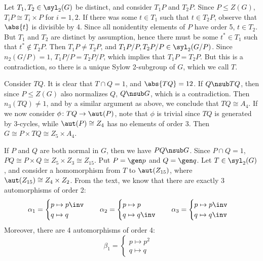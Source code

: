 \begin{solenum}
    Let $T_1, T_2 \in \syl_2(G)$ be distinct, and consider $T_1P$ and $T_2P$.
	Since $P \leq Z(G)$, $T_iP \cong T_i \times P$ for $i = 1, 2$.
	If there was some $t \in T_1$ such that $t \in T_2P$, observe that $\abs{t}$ is divisible by 4.
	Since all nonidentity elements of $P$ have order 5, $t \in T_2$.
	But $T_1$ and $T_2$ are distinct by assumption, hence there must be some $t^* \in T_1$ such that $t^* \notin T_2P$.
	Then $T_1P \neq T_2P$, and $T_1P/P, T_2P/P \in \syl_2(G/P)$.
	Since $n_2(G/P) = 1$, $T_1P/P = T_2P/P$, which implies that $T_1P = T_2P$.
	But this is a contradiction, so there is a unique Sylow 2-subgroup of $G$, which we call $T$.

    Consider $TQ$.
	It is clear that $T \cap Q = 1$, and $\abs{TQ} = 12$.
	If $Q \nsub TQ$, then since $P \leq Z(G)$ also normalizes $Q$, $Q \nsub G$, which is a contradiction.
	Then $n_3(TQ) \neq 1$, and by a similar argument as above, we conclude that $TQ \cong A_4$.
	If we now consider $\phi \colon TQ \to \aut(P)$, note that $\phi$ is trivial since $TQ$ is generated by 3-cycles, while $\aut(P) \cong Z_4$ has no elements of order 3.
	Then $G \cong P \times TQ \cong Z_5 \times A_4$.
    \item If $P$ and $Q$ are both normal in $G$, then we have $PQ \nsub G$.
	Since $P \cap Q = 1$, $PQ \cong P \times Q \cong Z_5 \times Z_3 \cong Z_{15}$.
	Put $P = \gen p$ and $Q = \gen q$.
	Let $T \in \syl_2(G)$, and consider a homomorphism from $T$ to $\aut(Z_{15})$, where $\aut(Z_{15}) \cong Z_4 \times Z_2$.
	From the text, we know that there are exactly 3 automorphisms of order 2:
    \[
    	\alpha_1 = 
        \begin{cases}
            p \mapsto p\inv \\
            q \mapsto q
        \end{cases} \quad
        \alpha_2 = 
        \begin{cases}
            p \mapsto p \\
            q \mapsto q\inv
        \end{cases} \quad
        \alpha_3 = 
        \begin{cases}
            p \mapsto p\inv \\
            q \mapsto q\inv
        \end{cases}
	\]
    Moreover, there are 4 automorphisms of order 4:
    \[
    	\beta_1 = 
        \begin{cases}
            p \mapsto p^2 \\
            q \mapsto q
        \end{cases} \quad
\]
\end{solenum}
